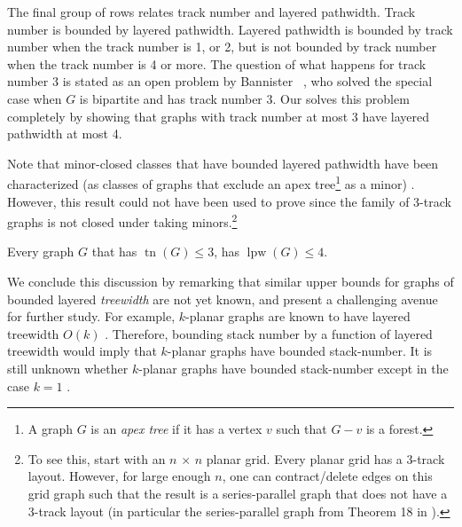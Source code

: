 \documentclass{patmorin}
\DeclareMathOperator{\tr}{tn}
\DeclareMathOperator{\lpw}{lpw}
\begin{document}
The final group of rows relates track number and layered pathwidth.  Track number is bounded by layered pathwidth.  Layered pathwidth is bounded by track number when the track number is 1, or 2, but is not bounded by track number when the track number is 4 or more.  The question of what happens for track number 3 is stated as an open problem by Bannister \etal\ \cite{bannister2018track}, who solved the special case when $G$ is bipartite and has track number 3.  Our  solves this problem completely by showing that graphs with track number at most 3 have layered pathwidth at most 4.

Note that minor-closed classes that have bounded layered pathwidth have been characterized (as classes of graphs that exclude an apex tree\footnote{A graph $G$ is an {\em apex tree} if it has a vertex $v$ such that $G-v$ is a forest. } as a minor) \cite{DBLP:journals/corr/abs-1810-08314}. However, this result could not have been used to prove  since the family of 3-track graphs is not closed under taking minors.\footnote{To see this, start with an $ n\, \times\, n$ planar grid. Every planar grid has a 3-track layout. However, for large enough $n$, one can contract/delete edges on this grid graph such that the result is a series-parallel graph that does not have a 3-track layout (in particular the series-parallel graph from Theorem 18 in \cite{bannister2018track}).}

\begin{thm}
 Every graph $G$ that has $\tr(G)\le 3$, has $\lpw(G)\le 4$.
\end{thm}


We conclude this discussion by remarking that similar upper bounds for graphs of bounded layered \emph{treewidth} are not yet known, and present a challenging avenue for further study.  For example, $k$-planar graphs are known to have layered treewidth $O(k)$ \cite[Theorem~3.1]{DBLP:journals/siamdm/DujmovicEW17}.  Therefore, bounding stack number by a function of layered treewidth would imply that $k$-planar graphs have bounded stack-number. It is still unknown whether $k$-planar graphs have bounded stack-number except in the case $k=1$ \cite{DBLP:journals/algorithmica/BekosBKR17,DBLP:journals/corr/AlamBK15}.



\end{document}
